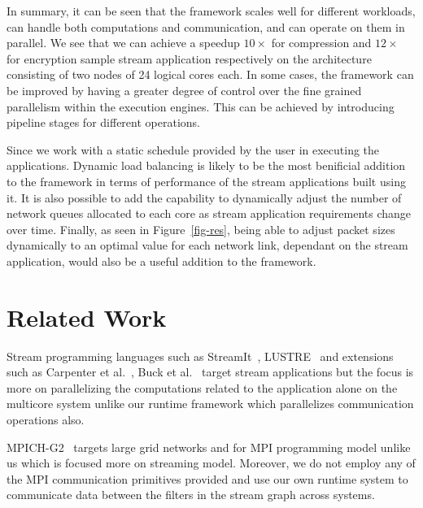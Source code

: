 \documentclass[10pt, conference, compsocconf, reqno]{IEEEtran}
\newcommand{\comment}[1]{}
\begin{document}
In summary, it can be seen that the framework scales well for different workloads, can handle both computations and communication, and can operate on them in parallel. We see that we can achieve a speedup $10\times$ for compression and $12\times$ for encryption sample stream application respectively on the architecture consisting of two nodes of 24 logical cores each. In some cases, the framework can be improved by having a greater degree of control over the fine grained parallelism within the execution engines. This can be achieved by introducing pipeline stages for different operations.

\comment{Results also suggest where efforts should be made in developing the framework further. Until now, the focus has been on deploying the execution engines in order to execute stream applications and to enable optimal communication between separate nodes.}

\comment{Future work will address some of the opportunities presented by these execution engines and the collaboration between them.}

Since we work with a static schedule provided by the user in executing the applications. Dynamic load balancing is likely to be the most benificial addition to the framework in terms of performance of the stream applications built using it. It is also possible to add the capability to dynamically adjust the number of network queues allocated to each core as stream application requirements change over time. Finally, as seen in Figure~\ref{fig-res}, being able to adjust packet sizes dynamically to an optimal value for each network link, dependant on the stream application, would also be a useful addition to the framework.

\section{Related Work}

Stream programming languages such as StreamIt~\cite{Thies:2002:SLS:647478.727935}, LUSTRE~\cite{Halbwachs91thesynchronous} and extensions such as Carpenter et al.~\cite{Carpenter:2007:SMD:1776200.1776217}, Buck et al.~\cite{Buck:2004:BGS:1015706.1015800} target stream applications but the focus is more on parallelizing the computations related to the application alone on the multicore system unlike our runtime framework which parallelizes communication operations also.

MPICH-G2~\cite{Karonis02mpich-g2:a} targets large grid networks and for MPI programming model unlike us which is focused more on streaming model. Moreover, we do not employ any of the MPI communication primitives provided and use our own runtime system to communicate data between the filters in the stream graph across systems.
\end{document}
